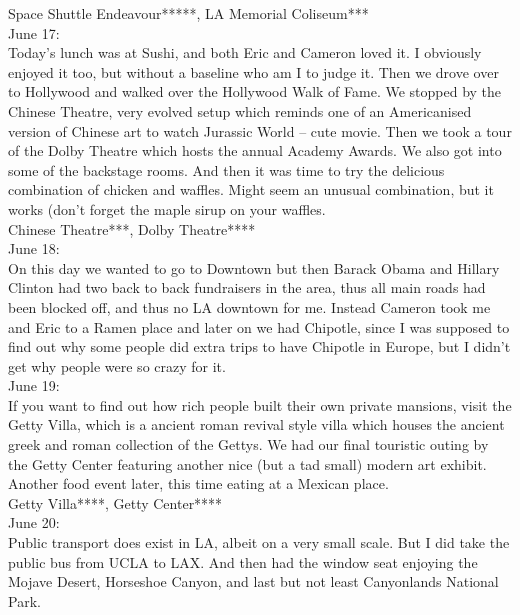 Space Shuttle Endeavour*****, LA Memorial Coliseum***\\

June 17:\\
Today's lunch was at Sushi, and both Eric and Cameron loved it. I obviously enjoyed it too, but without a baseline who am I to judge it. Then we drove over to Hollywood and walked over the Hollywood Walk of Fame. We stopped by the Chinese Theatre, very evolved setup which reminds one of an Americanised version of Chinese art to watch Jurassic World -- cute movie. Then we took a tour of the Dolby Theatre which hosts the annual Academy Awards. We also got into some of the backstage rooms. And then it was time to try the delicious combination of chicken and waffles. Might seem an unusual combination, but it works (don't forget the maple sirup on your waffles.\\

Chinese Theatre***, Dolby Theatre****\\




June 18:\\
On this day we wanted to go to Downtown but then Barack Obama and Hillary Clinton had two back to back fundraisers in the area, thus all main roads had been blocked off, and thus no LA downtown for me. Instead Cameron took me and Eric to a Ramen place and later on we had Chipotle, since I was supposed to find out why some people did extra trips to have Chipotle in Europe, but I didn't get why people were so crazy for it.\\



June 19:\\
If you want to find out how rich people built their own private mansions, visit the Getty Villa, which is a ancient roman revival style villa which houses the ancient greek and roman collection of the Gettys. We had our final touristic outing by the Getty Center featuring another nice (but a tad small) modern art exhibit. Another food event later, this time eating at a Mexican place.\\

Getty Villa****, Getty Center****\\

June 20:\\
Public transport does exist in LA, albeit on a very small scale. But I did take the public bus from UCLA to LAX. And then had the window seat enjoying the Mojave Desert, Horseshoe Canyon, and last but not least Canyonlands National Park.\\


